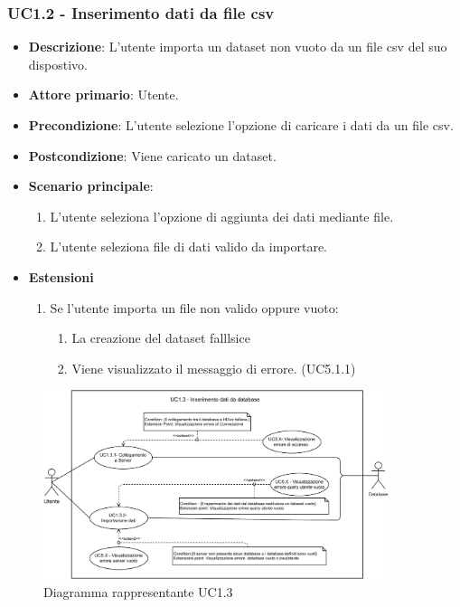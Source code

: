 \subsubsection{UC1.2 - Inserimento dati da file csv}
\label{ssub:UC1.1.1}
\begin{itemize}
    \item \textbf{Descrizione}: L'utente importa un dataset non vuoto da un file csv del suo dispostivo.

    \item \textbf{Attore primario}: Utente.
    
    \item \textbf{Precondizione}:   L'utente selezione l'opzione di caricare i dati da un file csv.
    \item \textbf{Postcondizione}:  Viene caricato un dataset. 

	\item \textbf{Scenario principale}:
		\begin{enumerate}
			\item L'utente seleziona l'opzione di aggiunta dei dati mediante file.
			\item L'utente seleziona file di dati valido da importare.
        \end{enumerate}
     
    \item \textbf{Estensioni}
    \begin{enumerate}
    
        \item Se l'utente importa un file non valido oppure vuoto:
        \begin{enumerate}
            \item La creazione del dataset falllsice
            \item Viene visualizzato il messaggio di errore. (UC5.1.1)
        \end{enumerate}
    \end{enumerate}
\end{itemize}

\newpage
\begin{figure}[h]
    \centering
    \includegraphics[width=0.9\textwidth]{componenti/casi-duso/diagrammi/UC1_3.pdf}
    \caption{Diagramma rappresentante UC1.3}
    \label{fig:UC1.3}
\end{figure}


